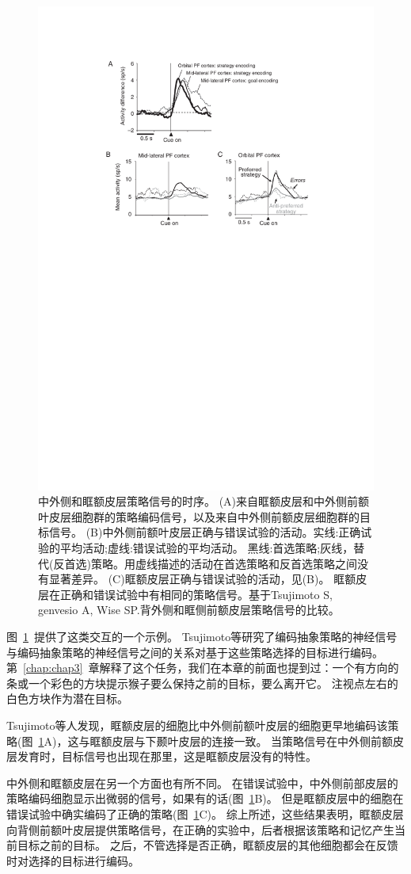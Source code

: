 \begin{figure}
	\centering
	\includegraphics[width=0.5\linewidth]{chap6/6_15}
	\caption{中外侧和眶额皮层策略信号的时序。
		(A)来自眶额皮层和中外侧前额叶皮层细胞群的策略编码信号，以及来自中外侧前额皮层细胞群的目标信号。
		(B)中外侧前额叶皮层正确与错误试验的活动。实线:正确试验的平均活动;虚线:错误试验的平均活动。
		黑线:首选策略;灰线，替代(反首选)策略。用虚线描述的活动在首选策略和反首选策略之间没有显著差异。
		(C)眶额皮层正确与错误试验的活动，见(B)。
		眶额皮层在正确和错误试验中有相同的策略信号。基于Tsujimoto S, genvesio A, Wise SP.背外侧和眶侧前额皮层策略信号的比较\cite{tsujimoto2011comparison}。}
	\label{fig:6_15}
\end{figure}


图~\ref{fig:6_15}~提供了这类交互的一个示例。
Tsujimoto等\cite{tsujimoto2011comparison}研究了编码抽象策略的神经信号与编码抽象策略的神经信号之间的关系对基于这些策略选择的目标进行编码。
第~\ref{chap:chap3}~章解释了这个任务，我们在本章的前面也提到过：一个有方向的条或一个彩色的方块提示猴子要么保持之前的目标，要么离开它。
注视点左右的白色方块作为潜在目标。


Tsujimoto等人发现，眶额皮层的细胞比中外侧前额叶皮层的细胞更早地编码该策略(图~\ref{fig:6_15}A)，这与眶额皮层与下颞叶皮层的连接一致。
当策略信号在中外侧前额皮层发育时，目标信号也出现在那里，这是眶额皮层没有的特性。


中外侧和眶额皮层在另一个方面也有所不同。
在错误试验中，中外侧前部皮层的策略编码细胞显示出微弱的信号，如果有的话(图~\ref{fig:6_15}B)。
但是眶额皮层中的细胞在错误试验中确实编码了正确的策略(图~\ref{fig:6_15}C)。
综上所述，这些结果表明，眶额皮层向背侧前额叶皮层提供策略信号，在正确的实验中，后者根据该策略和记忆产生当前目标之前的目标。
之后，不管选择是否正确，眶额皮层的其他细胞都会在反馈时对选择的目标进行编码。


